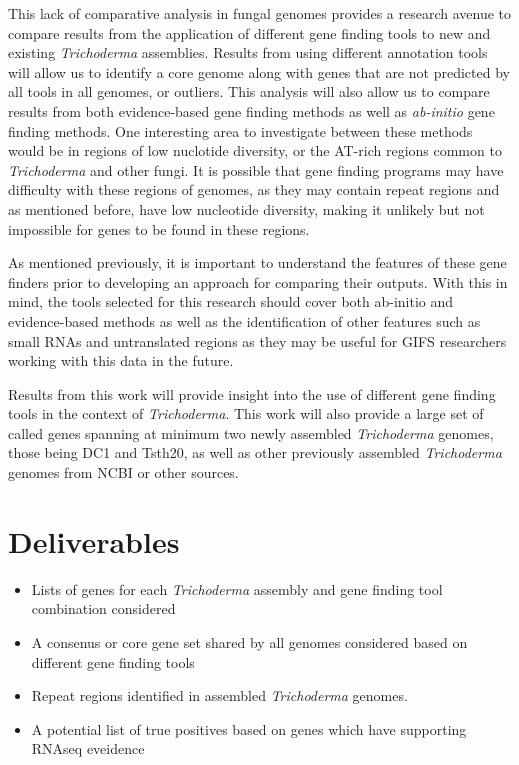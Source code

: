 \documentclass[12pt]{article}
\begin{document}
This lack of comparative analysis in fungal genomes provides a
research avenue to compare results from the application of different
gene finding tools to new and existing \textit{Trichoderma}
assemblies. Results from using different annotation tools will allow
us to identify a core genome along with genes that are not predicted
by all tools in all genomes, or outliers. This analysis will also
allow us to compare results from both evidence-based gene finding
methods as well as \textit{ab-initio} gene finding methods. One
interesting area to investigate between these methods would be in
regions of low nuclotide diversity, or the AT-rich regions common to
\textit{Trichoderma} and other fungi. It is possible that gene finding
programs may have difficulty with these regions of genomes, as they
may contain repeat regions and as mentioned before, have low
nucleotide diversity, making it unlikely but not impossible for genes
to be found in these regions.

As mentioned previously, it is important to understand the features of
these gene finders prior to developing an approach for comparing their
outputs. With this in mind, the tools selected for this research
should cover both ab-initio and evidence-based methods as well as the
identification of other features such as small RNAs and untranslated
regions as they may be useful for GIFS researchers working with this
data in the future.

Results from this work will provide insight into the use of different
gene finding tools in the context of \textit{Trichoderma}. This work
will also provide a large set of called genes spanning at minimum two
newly assembled \textit{Trichoderma} genomes, those being DC1 and
Tsth20, as well as other previously assembled \textit{Trichoderma}
genomes from NCBI or other sources.

\section{Deliverables}
\begin{itemize}
\item Lists of genes for each \textit{Trichoderma} assembly and gene
  finding tool combination considered
\item A consenus or core gene set shared by all genomes considered
  based on different gene finding tools
\item Repeat regions identified in assembled \textit{Trichoderma}
  genomes.
\item A potential list of true positives based on genes which have
  supporting RNAseq eveidence
\end{itemize}
\end{document}
